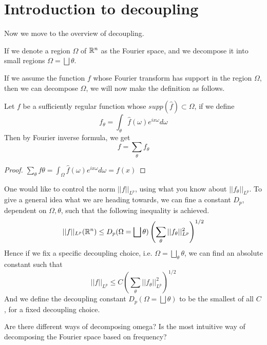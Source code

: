 \section*{Introduction to decoupling}
Now we move to the overview of decoupling.

If we denote a region $\Omega$ of $\mathbb{R}^n$ as the Fourier space, and we decompose it into small regions $\Omega=\bigsqcup\theta$.

If we assume the function $f$ whose Fourier transform has support in the region $\Omega$, then we can decompose $\Omega$, we will now make the definition as follows.
\begin{definition}[Decoupling]
    Let $f$ be a sufficiently regular function whose $supp(\widehat{f})\subset\Omega$, if we define
    \begin{equation*}
        f_\theta=\int_\theta\widehat{f}(\omega)e^{ix\omega}d\omega
    \end{equation*}
    Then by Fourier inverse formula, we get
    \begin{equation*}
        f=\sum_\theta f_\theta
    \end{equation*}
\end{definition}
\begin{proof}
    $\sum_\theta f\theta=\int_\Omega \widehat{f}(\omega)e^{ix\omega}d\omega=f(x)$
\end{proof}

One would like to control the norm $||f||_{L^p}$, using what you know about $||f_\theta||_{L^p}$. To give a general idea what we are heading towards, we can fine a constant $D_p$, dependent on $\Omega, \theta$, such that the following inequality is achieved.
\begin{equation*}
    ||f||_{L^p}(\mathbb{R}^n)\leq D_p(\Omega=\bigsqcup\theta)\left(\sum_\theta||f_\theta||_{L^p}^2\right)^{1/2}
\end{equation*}
Hence if we fix a specific decoupling choice, i.e. $\Omega=\bigsqcup_\theta\theta$, we can find an absolute constant such that
\begin{equation*}
    ||f||_{L^p}\leq C\left(\sum_\theta ||f_\theta||_{L^p}^2\right)^{1/2}
\end{equation*}
And we define the decoupling constant $D_p(\Omega=\bigsqcup\theta)$ to be the smallest of all $C$, for a fixed decoupling choice.



\begin{remark}
    Are there different ways of decomposing omega? Is the most intuitive way of decomposing the Fourier space based on frequency?
\end{remark}

